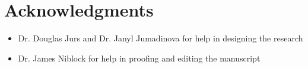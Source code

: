 \chapter*{Acknowledgments}
\label{ch:acknowledgements}

\begin{itemize}
	\item Dr. Douglas Jurs and Dr. Janyl Jumadinova for help in designing the research
	\item Dr. James Niblock for help in proofing and editing the manuscript 
\end{itemize}